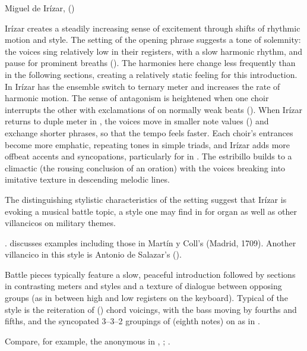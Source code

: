 
{Miguel de Irízar, 
()}

Irízar creates a steadily increasing sense of excitement through shifts of
rhythmic motion and style.
The setting of the opening phrase suggests a tone of solemnity: the voices sing
relatively low in their registers, with a slow harmonic rhythm, and pause for
prominent breaths ().
The harmonies here change less frequently than in the following sections,
creating a relatively static feeling for this introduction.
In  Irízar has the ensemble switch to ternary meter and increases
the rate of harmonic motion.
The sense of antagonism is heightened when one choir interrupts the other with
exclamations of  on normally weak beats ().
When Irízar returns to duple meter in , the voices move in smaller
note values () and exchange shorter phrases, so that the tempo
feels faster.
Each choir's entrances become more emphatic, repeating tones in simple triads,
and Irízar adds more offbeat accents and syncopations, particularly for  in .
The estribillo builds to a climactic  (the rousing conclusion of
an oration) with the voices breaking into imitative texture in descending
melodic lines.

The distinguishing stylistic characteristics of the setting suggest that Irízar
is evoking a musical battle topic, a style one may find in  for
organ as well as other villancicos on military themes.%
\begin{Footnote}
    \Autocites
    []{Grove}
    [288--294]{Illari:Polychoral}.
    \Autocite{Sutton:IberianBatalla} discusses examples including those in
    Martín y Coll's  (Madrid, 1709).
    Another villancico in this style is Antonio de Salazar's  ().
\end{Footnote}
Battle pieces typically feature a slow, peaceful introduction followed by
sections in contrasting meters and styles and a texture of dialogue between
opposing groups (as in between high and low registers on the keyboard).  
Typical of the style is the reiteration of  () chord voicings, with the bass moving by fourths and fifths, and the
syncopated 3--3--2 groupings of  (eighth notes) on  as in .%
\begin{Footnote}
    Compare, for example, the anonymous  in ,
    ; \autocite{Araujo:Batalla}.  
\end{Footnote}

